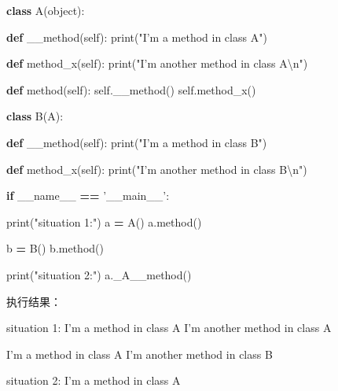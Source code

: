 \documentclass[]{ctexbook}
\newenvironment{Shaded}{\begin{snugshade}}{\end{snugshade}}
\newcommand{\BuiltInTok}[1]{#1}
\newcommand{\CharTok}[1]{\textcolor[rgb]{0.31,0.60,0.02}{#1}}
\newcommand{\ControlFlowTok}[1]{\textcolor[rgb]{0.13,0.29,0.53}{\textbf{#1}}}
\newcommand{\ExtensionTok}[1]{#1}
\newcommand{\KeywordTok}[1]{\textcolor[rgb]{0.13,0.29,0.53}{\textbf{#1}}}
\newcommand{\NormalTok}[1]{#1}
\newcommand{\OperatorTok}[1]{\textcolor[rgb]{0.81,0.36,0.00}{\textbf{#1}}}
\newcommand{\StringTok}[1]{\textcolor[rgb]{0.31,0.60,0.02}{#1}}
\newcommand{\VariableTok}[1]{\textcolor[rgb]{0.00,0.00,0.00}{#1}}
\begin{document}
\begin{Shaded}
\begin{Highlighting}[]
\KeywordTok{class}\NormalTok{ A(}\BuiltInTok{object}\NormalTok{):}

    \KeywordTok{def}\NormalTok{ __method(}\VariableTok{self}\NormalTok{):}
        \BuiltInTok{print}\NormalTok{(}\StringTok{"I'm a method in class A"}\NormalTok{)}

    \KeywordTok{def}\NormalTok{ method_x(}\VariableTok{self}\NormalTok{):}
        \BuiltInTok{print}\NormalTok{(}\StringTok{"I'm another method in class A}\CharTok{\textbackslash{}n}\StringTok{"}\NormalTok{)}

    \KeywordTok{def}\NormalTok{ method(}\VariableTok{self}\NormalTok{):}
        \VariableTok{self}\NormalTok{.__method()}
        \VariableTok{self}\NormalTok{.method_x()}


\KeywordTok{class}\NormalTok{ B(A):}

    \KeywordTok{def}\NormalTok{ __method(}\VariableTok{self}\NormalTok{):}
        \BuiltInTok{print}\NormalTok{(}\StringTok{"I'm a method in class B"}\NormalTok{)}

    \KeywordTok{def}\NormalTok{ method_x(}\VariableTok{self}\NormalTok{):}
        \BuiltInTok{print}\NormalTok{(}\StringTok{"I'm another method in class B}\CharTok{\textbackslash{}n}\StringTok{"}\NormalTok{)}


\ControlFlowTok{if} \VariableTok{__name__} \OperatorTok{==} \StringTok{'__main__'}\NormalTok{:}

    \BuiltInTok{print}\NormalTok{(}\StringTok{"situation 1:"}\NormalTok{)}
\NormalTok{    a }\OperatorTok{=}\NormalTok{ A()}
\NormalTok{    a.method()}

\NormalTok{    b }\OperatorTok{=}\NormalTok{ B()}
\NormalTok{    b.method()}

    \BuiltInTok{print}\NormalTok{(}\StringTok{"situation 2:"}\NormalTok{)}
\NormalTok{    a._A__method()}
\end{Highlighting}
\end{Shaded}

执行结果：

\begin{Shaded}
\begin{Highlighting}[]
\ExtensionTok{situation}\NormalTok{ 1:}
\ExtensionTok{I}\StringTok{'m a method in class A}
\StringTok{I'}\NormalTok{m another method in class A}

\ExtensionTok{I}\StringTok{'m a method in class A}
\StringTok{I'}\NormalTok{m another method in class B}

\ExtensionTok{situation}\NormalTok{ 2:}
\ExtensionTok{I}\StringTok{'m a method in class A}
\end{Highlighting}
\end{Shaded}
\end{document}
